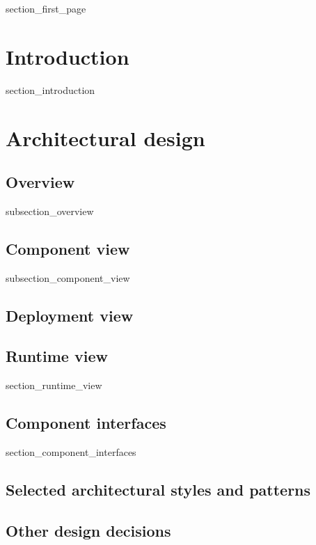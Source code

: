 \documentclass[a4paper]{article}
\begin{document}
{section_first_page}

\newpage
{}

\tableofcontents

\newpage
{}

\section{Introduction}\label{introduction}

{section_introduction}

\newpage

\section{Architectural design}\label{architectural_design}

\subsection{Overview}

{subsection_overview}

\subsection{Component view}

{subsection_component_view}

\subsection{Deployment view}

\newpage
\subsection{Runtime view}
{section_runtime_view}

\subsection{Component interfaces}
{section_component_interfaces}
\subsection{Selected architectural styles and patterns}
\subsection{Other design decisions}
\end{document}
